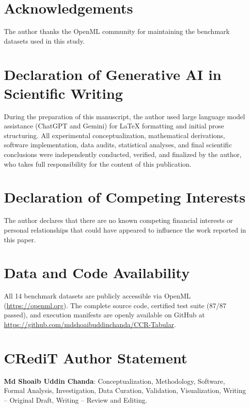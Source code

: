 \documentclass[preprint,12pt]{elsarticle}
\begin{document}
\section*{Acknowledgements}
The author thanks the OpenML community for maintaining the benchmark datasets used in this study.

\section*{Declaration of Generative AI in Scientific Writing}
During the preparation of this manuscript, the author used large language model assistance (ChatGPT and Gemini) for LaTeX formatting and initial prose structuring. All experimental conceptualization, mathematical derivations, software implementation, data audits, statistical analyses, and final scientific conclusions were independently conducted, verified, and finalized by the author, who takes full responsibility for the content of this publication.

\section*{Declaration of Competing Interests}
The author declares that there are no known competing financial interests or personal relationships that could have appeared to influence the work reported in this paper.

\section*{Data and Code Availability}
All 14 benchmark datasets are publicly accessible via OpenML (\url{https://openml.org}). The complete source code, certified test suite (87/87 passed), and execution manifests are openly available on GitHub at \url{https://github.com/mdshoaibuddinchanda/CCR-Tabular}.

\section*{CRediT Author Statement}
\textbf{Md Shoaib Uddin Chanda}: Conceptualization, Methodology, Software, Formal Analysis, Investigation, Data Curation, Validation, Visualization, Writing -- Original Draft, Writing -- Review and Editing.

\clearpage


\end{document}

